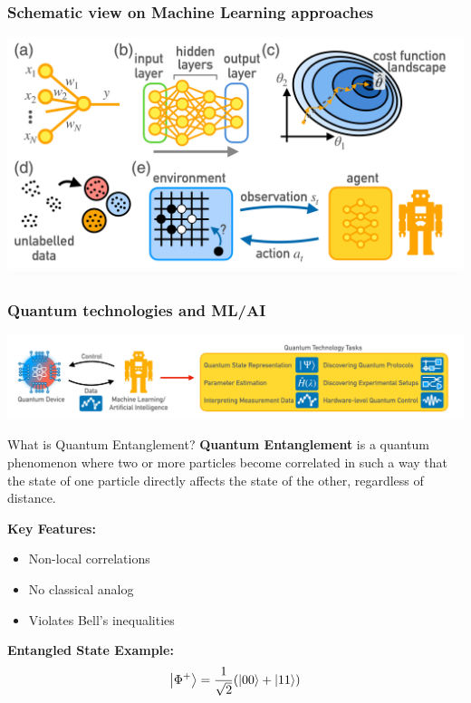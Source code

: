 \documentclass{beamer}
\begin{document}
\begin{frame}
\frametitle{Schematic view on Machine Learning approaches}


\centerline{\includegraphics[width=1.05\linewidth]{figures/krenn2}}

\end{frame}


\begin{frame}
\frametitle{Quantum technologies and ML/AI}
\centerline{\includegraphics[width=1.05\linewidth]{figures/krenn1}}

\end{frame}


\begin{frame}{What is Quantum Entanglement?}
\textbf{Quantum Entanglement} is a quantum phenomenon where two or more particles become correlated in such a way that the state of one particle directly affects the state of the other, regardless of distance.

\vspace{10pt}
\textbf{Key Features:}
\begin{itemize}
    \item Non-local correlations
    \item No classical analog
    \item Violates Bell's inequalities
\end{itemize}

\textbf{Entangled State Example:}
\[
\ket{\Phi^+} = \frac{1}{\sqrt{2}} (\ket{00} + \ket{11})
\]

\end{frame}
\end{document}
